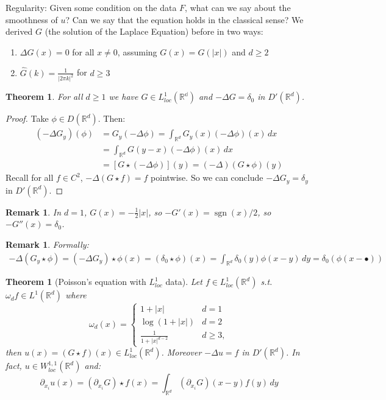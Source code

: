 \documentclass{report}
\theoremstyle{tommy}
\newtheorem{thm}[defn]{Theorem}
\newtheorem{rem}[defn]{Remark}
\newcommand{\sgn}{\operatorname{sgn}}
\begin{document}
  Regularity: Given some condition on the data \(F\), what can we say about the smoothness of \(u\)? Can we say that the equation holds in the classical sense? We derived \(G\) (the solution of the Laplace Equation) before in two ways:
  \begin{enumerate}
    \item \(\Delta G(x) = 0\) for all \(x \ne 0\), assuming \(G(x) = G(|x|)\) and \(d \ge 2\)
    \item \(\hat G(k) = \frac{1}{|2\pi k|^2}\) for \(d \ge 3\)
  \end{enumerate}
  
  \begin{thm}
    For all \(d \ge 1\) we have \(G \in L_{loc}^1(\mathbb{R^d})\) and \(- \Delta G = \delta_0\) in \(D'(\mathbb{R}^d)\).
  \end{thm}

  \begin{proof}
    Take \(\phi \in D(\mathbb{R}^d)\). Then:
    \begin{align*}
      (- \Delta G_y)(\phi) 
      &= G_y(-\Delta \phi)
      = \int_{\mathbb{R}^d} G_y(x) (-\Delta \phi)(x) \, dx \\
      &= \int_{\mathbb{R}^d} G(y-x) (-\Delta \phi)(x) \, dx \\
      &= [G \star (-\Delta \phi)](y) = (-\Delta)(G \star \phi)(y)
    \end{align*}
    Recall for all \(f \in C^2\), \(-\Delta (G \star f) = f\) pointwise. So we can conclude \(-\Delta G_y = \delta_y\) in \(D'(\mathbb{R}^d)\).
  \end{proof}
  
  \begin{rem}
    In \(d = 1\), \(G(x) = - \frac{1}{2}|x|\), so \(-G'(x) = \sgn(x)/2\), so \(-G''(x) = \delta_0\).
  \end{rem}

  \begin{rem}
    Formally: 
    \begin{align*}
      -\Delta(G_y \star \phi) = (-\Delta G_y) \star \phi(x) = (\delta_0 \star \phi)(x) = \int_{\mathbb{R}^d} \delta_0(y) \phi(x - y) \, dy = \delta_0 (\phi(x-\bullet))
    \end{align*}
  \end{rem}

  \begin{thm}[Poisson's equation with \(L_{loc}^1\) data]\label{PoissonsequationwithL1locdata}
    Let \(f \in L_{loc}^1(\mathbb{R}^d)\) s.t. \(\omega_d f \in L^1(\mathbb{R}^d)\) where 
    \[\omega_d(x) = \begin{cases}
      1 + |x| & d = 1 \\ \log(1 + |x|) & d=2 \\ \frac{1}{1 + |x|^{d-2}} & d \ge 3,
    \end{cases}\]
    then \(u(x) = (G\star f)(x) \in L_{loc}^1(\mathbb{R}^d)\). Moreover \(-\Delta u = f\) in \(D'(\mathbb{R}^d)\). In fact, \(u \in W_{loc}^{1,1}(\mathbb{R}^d)\) and:
    \[\partial_{x_i} u(x) = (\partial_{x_i} G) \star f(x) = \int_{\mathbb{R}^d} (\partial_{x_i} G)(x-y)f(y) \, dy\]
  \end{thm}
\end{document}

